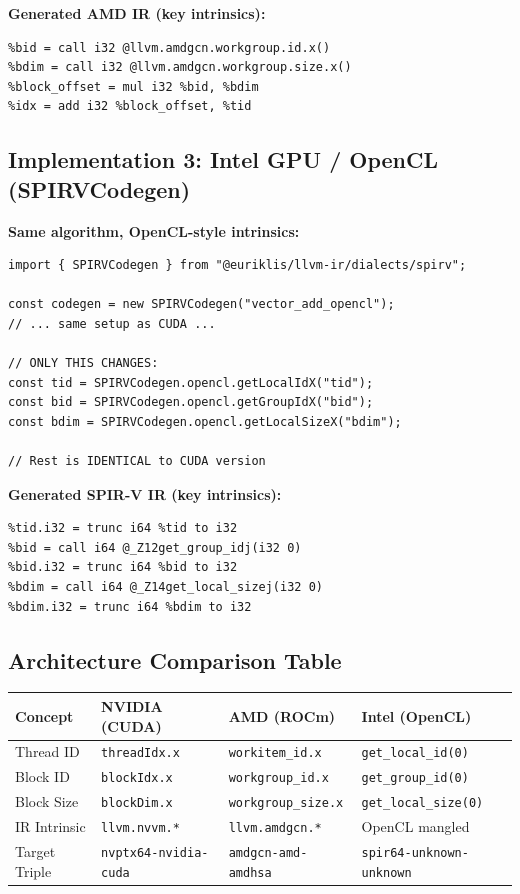 \documentclass[11pt]{article}
\begin{document}
\textbf{Generated AMD IR (key intrinsics):}
\begin{lstlisting}[style=ir]
%tid = call i32 @llvm.amdgcn.workitem.id.x()
%bid = call i32 @llvm.amdgcn.workgroup.id.x()
%bdim = call i32 @llvm.amdgcn.workgroup.size.x()
%block_offset = mul i32 %bid, %bdim
%idx = add i32 %block_offset, %tid
\end{lstlisting}

\subsection{Implementation 3: Intel GPU / OpenCL (SPIRVCodegen)}

\textbf{Same algorithm, OpenCL-style intrinsics:}

\begin{lstlisting}[style=ts]
import { SPIRVCodegen } from "@euriklis/llvm-ir/dialects/spirv";

const codegen = new SPIRVCodegen("vector_add_opencl");
// ... same setup as CUDA ...

// ONLY THIS CHANGES:
const tid = SPIRVCodegen.opencl.getLocalIdX("tid");
const bid = SPIRVCodegen.opencl.getGroupIdX("bid");
const bdim = SPIRVCodegen.opencl.getLocalSizeX("bdim");

// Rest is IDENTICAL to CUDA version
\end{lstlisting}

\textbf{Generated SPIR-V IR (key intrinsics):}
\begin{lstlisting}[style=ir]
%tid = call i64 @_Z12get_local_idj(i32 0)
%tid.i32 = trunc i64 %tid to i32
%bid = call i64 @_Z12get_group_idj(i32 0)
%bid.i32 = trunc i64 %bid to i32
%bdim = call i64 @_Z14get_local_sizej(i32 0)
%bdim.i32 = trunc i64 %bdim to i32
\end{lstlisting}

\subsection{Architecture Comparison Table}

\begin{center}
\begin{tabular}{|l|l|l|l|}
\hline
\textbf{Concept} & \textbf{NVIDIA (CUDA)} & \textbf{AMD (ROCm)} & \textbf{Intel (OpenCL)} \\
\hline
Thread ID & \texttt{threadIdx.x} & \texttt{workitem\_id.x} & \texttt{get\_local\_id(0)} \\
Block ID & \texttt{blockIdx.x} & \texttt{workgroup\_id.x} & \texttt{get\_group\_id(0)} \\
Block Size & \texttt{blockDim.x} & \texttt{workgroup\_size.x} & \texttt{get\_local\_size(0)} \\
IR Intrinsic & \texttt{llvm.nvvm.*} & \texttt{llvm.amdgcn.*} & OpenCL mangled \\
Target Triple & \texttt{nvptx64-nvidia-cuda} & \texttt{amdgcn-amd-amdhsa} & \texttt{spir64-unknown-unknown} \\
\hline
\end{tabular}
\end{center}
\end{document}
